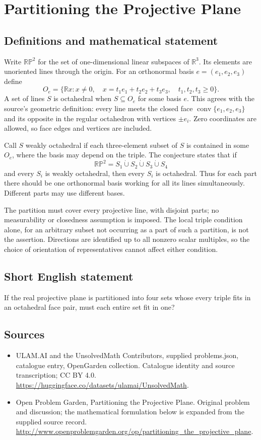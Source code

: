 \documentclass[11pt,a4paper]{article}
\begin{document}
\section*{Partitioning the Projective Plane}\label{statement}

\subsection{Definitions and mathematical statement}
Write $\mathbb{RP}^2$ for the set of one-dimensional linear subspaces of
$\mathbb R^3$. Its elements are unoriented lines through the origin.
For an orthonormal basis $e=(e_1,e_2,e_3)$ define
\[
 O_e=\{\mathbb R x:x\ne0,\quad
                x=t_1e_1+t_2e_2+t_3e_3,\quad t_1,t_2,t_3\ge0\}.
\]
A set of lines $S$ is octahedral when $S\subseteq O_e$ for some basis $e$.
This agrees with the source's geometric definition: every line meets
the closed face $\operatorname{conv}\{e_1,e_2,e_3\}$ and its opposite in
the regular octahedron with vertices $\pm e_i$. Zero coordinates are allowed,
so face edges and vertices are included.

Call $S$ weakly octahedral if each three-element subset of $S$ is
contained in some $O_e$, where the basis may depend on the triple.
The conjecture states that if
\[
 \mathbb{RP}^2=S_1\mathbin{\dot\cup}S_2\mathbin{\dot\cup}S_3
                         \mathbin{\dot\cup}S_4
\]
and every $S_i$ is weakly octahedral, then every $S_i$ is octahedral.
Thus for each part there should be one orthonormal basis working for
all its lines simultaneously. Different parts may use different bases.

The partition must cover every projective line, with disjoint parts;
no measurability or closedness assumption is imposed. The local triple
condition alone, for an arbitrary subset not occurring as a part of such
a partition, is not the assertion. Directions are identified up to all
nonzero scalar multiples, so the choice of orientation of representatives
cannot affect either condition.
\subsection{Short English statement}
If the real projective plane is partitioned into four sets whose every triple fits in an octahedral face pair, must each entire set fit in one?
\subsection{Sources}
\begin{itemize}
\item[S1] ULAM.AI and the UnsolvedMath Contributors, supplied problems.json, catalogue entry, OpenGarden collection. Catalogue identity and source transcription; CC BY 4.0.
\url{https://huggingface.co/datasets/ulamai/UnsolvedMath}.
\item[S2] Open Problem Garden, Partitioning the Projective Plane. Original problem and discussion; the mathematical formulation below is expanded from the supplied source record.
\url{http://www.openproblemgarden.org/op/partitioning_the_projective_plane}.
\end{itemize}
\end{document}
